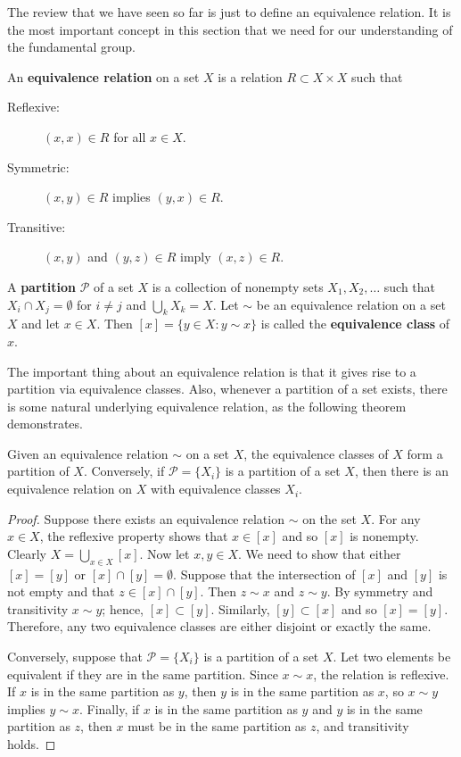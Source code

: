 The review that we have seen so far is just to define an equivalence relation. It is the most important concept in this section that we need for our understanding of the fundamental group.

\begin{definition}
An \textbf{equivalence relation} on a set $X$ is a relation $R \subset X \times X$ such that
\begin{description}
  \item[Reflexive:] $(x, x) \in R$ for all $x \in X$.
  \item[Symmetric:] $(x, y) \in R$ implies $(y, x) \in R$.
  \item[Transitive:] $(x, y)$ and $(y, z) \in R$ imply $(x, z) \in R$.
\end{description}
\end{definition}

A \textbf{partition} ${\mathcal P}$ of a set $X$ is a collection of nonempty sets $X_1, X_2, \ldots$ such that $X_i \cap X_j = \emptyset$ for $i  \neq j$ and $\bigcup_k X_k = X$. Let $\sim$ be an equivalence relation on a set $X$ and let $x \in X$.  Then $[x] = \{ y \in X : y \sim x \}$ is called the \textbf{equivalence class} of $x$.

The important thing about an equivalence relation is that it gives rise to a partition via equivalence classes.  Also, whenever a partition of a set exists, there is some natural  underlying equivalence relation, as the following theorem demonstrates.

\medskip

\begin{theorem}
Given an equivalence relation $\sim$ on a set $X$, the equivalence classes of $X$ form a partition of $X$.  Conversely, if ${\mathcal P} = \{ X_i\}$ is a partition of a set $X$, then there is an equivalence relation on $X$ with equivalence classes $X_i$.
\end{theorem}

\begin{proof}
Suppose there exists an equivalence relation $\sim$ on the set $X$.  For any $x \in X$, the reflexive property shows that $x \in [x]$ and so $[x]$ is nonempty.  Clearly $X = \bigcup_{x \in X} [x]$.  Now let $x, y \in X$. We need to show that either $[x] = [y]$ or $[x] \cap [y] = \emptyset$.  Suppose that the intersection of $[x]$ and $[y]$ is not empty and that $z \in [x] \cap [y]$. Then $z \sim x$ and $z \sim y$.  By symmetry and transitivity $x \sim y$; hence, $[x] \subset [y]$.  Similarly, $[y] \subset [x]$ and so $[x] = [y]$.  Therefore, any two equivalence classes are either disjoint or exactly the same.

Conversely, suppose that ${\mathcal P} = \{X_i\}$ is a partition of a set $X$.  Let two elements be equivalent if they are in the same partition. Since $x\sim x$, the relation is reflexive.  If $x$ is in the same partition as $y$, then $y$ is in the same partition as $x$, so $x \sim y$ implies $y \sim x$.  Finally, if $x$ is in the same partition as $y$ and $y$ is in the same partition as $z$, then $x$ must be in the same partition as $z$, and transitivity holds.
\end{proof}
\newpage
